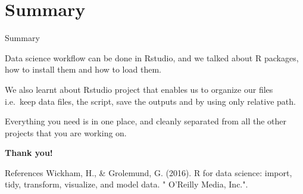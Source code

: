 \documentclass[
  ignorenonframetext,
]{beamer}
\begin{document}
\section{Summary}
\begin{frame}{Summary}
\protect\hypertarget{summary}{}

Data science workflow can be done in Rstudio, and we talked about R
packages, how to install them and how to load them. \pause

We also learnt about Rstudio project that enables us to organize our
files i.e.~keep data files, the script, save the outputs and by using
only relative path. \pause

Everything you need is in one place, and cleanly separated from all the
other projects that you are working on.

\end{frame}

\begin{frame}{}
\protect\hypertarget{section-6}{}

\begin{center}
\textbf{Thank you!}
\end{center}

\end{frame}


\begin{frame}{References}
Wickham, H., \& Grolemund, G. (2016). R for data science: import, tidy, transform, visualize, and model data. " O'Reilly Media, Inc.".
\end{frame}
\end{document}
